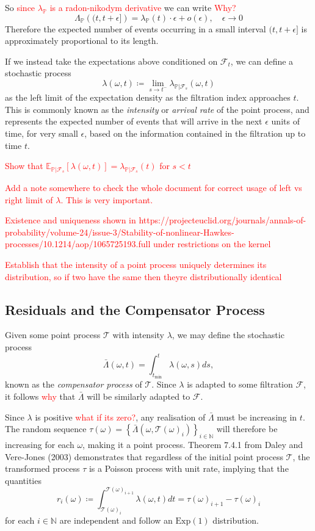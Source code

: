 \documentclass[honours,12pt]{unswthesis}
\numberwithin{equation}{section}
\begin{document}
So \textcolor{red}{since $\lambda_\mathbb{P}$ is a radon-nikodym derivative} we can write \textcolor{red}{Why?}
$$\Lambda_{\mathbb{P}}\left((t,t+\epsilon]\right)=\lambda_{\mathbb{P}}(t)\cdot\epsilon+o(\epsilon),\quad \epsilon\to 0$$
Therefore the expected number of events occurring in a small interval $(t,t+\epsilon]$ is approximately proportional to its length.

If we instead take the expectations above conditioned on $\mathcal{F}_t$, we can define a stochastic process
$$\lambda(\omega,t) \coloneq \lim_{s\to t^-}\lambda_{\mathbb{P}\vert\mathcal{F}_s}(\omega,t)$$
as the left limit of the expectation density as the filtration index approaches $t$. This is commonly known as the \textit{intensity} or \textit{arrival rate} of the point process, and represents the expected number of events that will arrive in the next $\epsilon$ units of time, for very small $\epsilon$, based on the information contained in the filtration up to time $t$.

\textcolor{red}{Show that $\mathbb{E}_{\mathbb{P}\vert\mathcal{F}_s}[\lambda(\omega,t)] = \lambda_{\mathbb{P}\vert\mathcal{F}_s}(t)$ for $s<t$}

\textcolor{red}{Add a note somewhere to check the whole document for correct usage of left vs right limit of $\lambda$. This is very important.}

\textcolor{red}{Existence and uniqueness shown in https://projecteuclid.org/journals/annals-of-probability/volume-24/issue-3/Stability-of-nonlinear-Hawkes-processes/10.1214/aop/1065725193.full under restrictions on the kernel}

\textcolor{red}{Establish that the intensity of a point process uniquely determines its distribution, so if two have the same then theyre distributionally identical}

\subsection{Residuals and the Compensator Process}
Given some point process $\mathcal{T}$ with intensity $\lambda$, we may define the stochastic process
$$\bar\Lambda(\omega,t)=\int_{t_\mathrm{min}}^t \lambda(\omega,s)ds,$$
known as the \textit{compensator process} of $\mathcal{T}$. Since $\lambda$ is adapted to some filtration $\mathcal{F}$, it follows \textcolor{red}{why} that $\bar\Lambda$ will be similarly adapted to $\mathcal{F}$.

Since $\lambda$ is positive \textcolor{red}{what if its zero?}, any realisation of $\bar\Lambda$ must be increasing in $t$. The random sequence $\tau(\omega)=\left\{\bar\Lambda(\omega,\mathcal{T}(\omega)_i)\right\}_{i\in\mathbb{N}}$ will therefore be increasing for each $\omega$, making it a point process. Theorem 7.4.1 from Daley and Vere-Jones (2003) \cite{DaleyVereJones} demonstrates that regardless of the initial point process $\mathcal{T}$, the transformed process $\tau$ is a Poisson process with unit rate, implying that the quantities
$$r_i(\omega)\coloneq \int_{\mathcal{T}(\omega)_i}^{\mathcal{T}(\omega)_{i+1}}\lambda(\omega,t)dt = \tau(\omega)_{i+1}-\tau(\omega)_{i}$$
for each $i\in\mathbb{N}$ are independent and follow an $\mathrm{Exp}(1)$ distribution.
\end{document}
